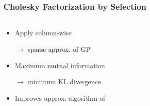 \documentclass{beamer}                             %
\begin{document}
\begingroup
\let\oldfootnoterule\footnoterule
\renewcommand\footnoterule{\only<3->\oldfootnoterule}
\begin{frame}
\frametitle{Cholesky Factorization by Selection}
\framesubtitle{}

\begin{columns}
  \begin{column}{0.6\textwidth}
    \begin{itemize}
      \item<+-> Apply column-wise

        \( \rightarrow \) sparse approx. of GP

      \item<+-> Maximum mutual information

        \( \rightarrow \) minimum KL divergence

      \item<+-> Improves approx. algorithm of \footnotemark
    \end{itemize}
  \end{column}
  \begin{column}{0.4\textwidth}
    \begin{figure}[h!]
        \centering
        \begin{subfigure}[h]{\textwidth}
          \begin{tikzpicture}[scale=1/5]
            
          \end{tikzpicture}
        \end{subfigure}
        \begin{subfigure}[h]{0.4 \textwidth}
        \end{subfigure}
    \end{figure}

    \vspace{-0.5cm}


\end{column}
\end{columns}
\end{frame}
\end{document}
